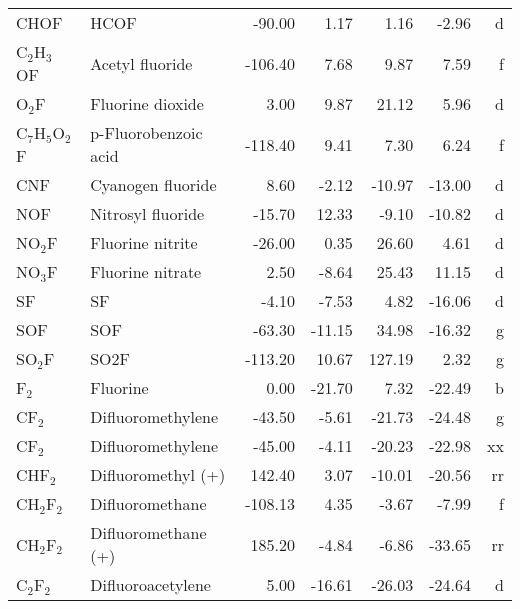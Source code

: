 \begin{table}
\begin{center}
\begin{tabular}{llrrrrr}
 CHOF        & HCOF                            &   -90.00    &     1.17  &     1.16  &    -2.96  &      d\\
 C$_2$H$_3$OF      & Acetyl fluoride                 &  -106.40    &     7.68  &     9.87  &     7.59  &      f\\
 O$_2$F         & Fluorine dioxide                &     3.00    &     9.87  &    21.12  &     5.96  &      d\\
 C$_7$H$_5$O$_2$F     & p-Fluorobenzoic acid            &  -118.40    &     9.41  &     7.30  &     6.24  &      f\\
 CNF         & Cyanogen fluoride               &     8.60    &    -2.12  &   -10.97  &   -13.00  &      d\\
 NOF         & Nitrosyl fluoride               &   -15.70    &    12.33  &    -9.10  &   -10.82  &      d\\
 NO$_2$F        & Fluorine nitrite                &   -26.00    &     0.35  &    26.60  &     4.61  &      d\\
 NO$_3$F        & Fluorine nitrate                &     2.50    &    -8.64  &    25.43  &    11.15  &      d\\
 SF          & SF                              &    -4.10    &    -7.53  &     4.82  &   -16.06  &      d\\
 SOF         & SOF                             &   -63.30    &   -11.15  &    34.98  &   -16.32  &      g\\
 SO$_2$F        & SO2F                            &  -113.20    &    10.67  &   127.19  &     2.32  &      g\\
 F$_2$          & Fluorine                        &     0.00    &   -21.70  &     7.32  &   -22.49  &      b\\
 CF$_2$         & Difluoromethylene               &   -43.50    &    -5.61  &   -21.73  &   -24.48  &      g\\
 CF$_2$         & Difluoromethylene               &   -45.00    &    -4.11  &   -20.23  &   -22.98  &     xx\\
 CHF$_2$        & Difluoromethyl (+)              &   142.40    &     3.07  &   -10.01  &   -20.56  &     rr\\
 CH$_2$F$_2$       & Difluoromethane                 &  -108.13    &     4.35  &    -3.67  &    -7.99  &      f\\
 CH$_2$F$_2$       & Difluoromethane (+)             &   185.20    &    -4.84  &    -6.86  &   -33.65  &     rr\\
 C$_2$F$_2$        & Difluoroacetylene               &     5.00    &   -16.61  &   -26.03  &   -24.64  &      d\\

\end{tabular}
\end{center}
\end{table}
